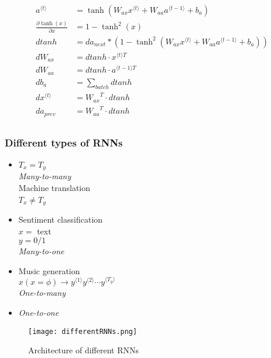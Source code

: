 \begin{align}
\displaystyle a^{\langle t \rangle} &= \tanh(W_{ax} x^{\langle t \rangle} + W_{aa} a^{\langle t-1 \rangle} + b_{a})\\
\displaystyle \frac{\partial \tanh(x)} {\partial x} &= 1 - \tanh^2(x)\\
\displaystyle {dtanh} &= da_{next} * ( 1 - \tanh^2(W_{ax}x^{\langle t \rangle}+W_{aa} a^{\langle t-1 \rangle} + b_{a}))\\
\displaystyle  {dW_{ax}} &= dtanh \cdot x^{\langle t \rangle T}\\
\displaystyle dW_{aa} &= dtanh \cdot a^{\langle t-1 \rangle T}\\
\displaystyle db_a& = \sum_{batch}dtanh\\
\displaystyle dx^{\langle t \rangle} &= { W_{ax}}^T \cdot dtanh\\
\displaystyle da_{prev} &= { W_{aa}}^T \cdot dtanh\\
\end{align}
\subsubsection{Different types of RNNs}
\begin{itemize}
\item
$T_x = T_y$\\
\textit{Many-to-many}\\
Machine translation\\
$T_x \neq T_y$\
\item
Sentiment classification\\
$x = $ text\\
$y = 0 / 1$\\
\textit{Many-to-one}
\item
Music generation\\
$x (x = \phi) \rightarrow y^{\langle 1 \rangle}y^{\langle 2 \rangle} \cdots y^{\langle T_y \rangle}$\\
\textit{One-to-many}
\item
\textit{One-to-one}
\end{itemize}
\begin{figure}[h]
    \centering
    \texttt{[image: differentRNNs.png]}
    \caption{Architecture of different RNNs}
    \label{fig:differentRNNs}
\end{figure}

